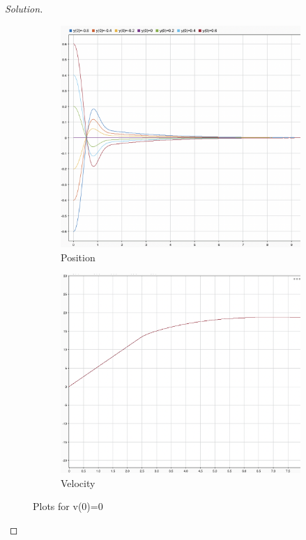 \documentclass{article}
\begin{document}
\begin{proof}[Solution]
\begin{figure}[h!]
    \centering
    \begin{subfigure}{0.4\linewidth}
      \includegraphics[width=\linewidth]{img14.png}
      \caption{Position}
    \end{subfigure}
    \begin{subfigure}{0.4\linewidth}
      \includegraphics[width=\linewidth]{img15.png}
      \caption{Velocity}
    \end{subfigure}
    \caption{Plots for v(0)=0}
  \end{figure}


\end{proof}
\end{document}
